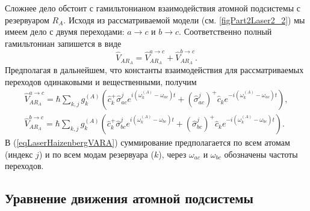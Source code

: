 Сложнее дело обстоит с гамильтонианом взаимодействия атомной
подсистемы с резервуаром $R_A$. Исходя из рассматриваемой модели
(см. \autoref{figPart2Laser2_2}) мы имеем дело с двумя переходами:
$a \rightarrow c$ и $b \rightarrow c$. Соответственно полный
гамильтониан запишется в виде
\begin{equation}
\hat{V}_{AR_A} = \hat{V}_{AR_A}^{a \rightarrow c} + \hat{V}_{AR_A}^{b \rightarrow c}.
\nonumber
\end{equation}
Предполагая в дальнейшем, что константы взаимодействия для
рассматриваемых переходов одинаковыми и вещественными, получим
\begin{eqnarray}
\hat{V}_{AR_A}^{a \rightarrow c} = \hbar \sum_{k,j} 
g_k^{(A)}
 \left(
\hat{c}_k^{+}\hat{\sigma}_{ac}^{j} e^{i\left(\omega_k^{(A)} - \omega_{ac}\right)t} +
\left(\hat{\sigma}_{ac}^{j}\right)^{+}\hat{c}_k e^{-i\left(\omega_k^{(A)} - \omega_{ac}\right)t}
\right),
\nonumber \\
\hat{V}_{AR_A}^{b \rightarrow c} = \hbar \sum_{k,j} 
g_k^{(A)}
 \left(
\hat{c}_k^{+}\hat{\sigma}_{bc}^{j} e^{i\left(\omega_k^{(A)} - \omega_{bc}\right)t} +
\left(\hat{\sigma}_{bc}^{j}\right)^{+}\hat{c}_k e^{-i\left(\omega_k^{(A)} - \omega_{bc}\right)t}
\right).
\label{eqLaserHaizenbergVARA}
\end{eqnarray}
В (\ref{eqLaserHaizenbergVARA}) суммирование предполагается по всем
атомам (индекс $j$) и по всем модам резервуара ($k$), через
$\omega_{ac}$ и $\omega_{bc}$ обозначены частоты переходов.

\subsection{Уравнение движения атомной подсистемы}


